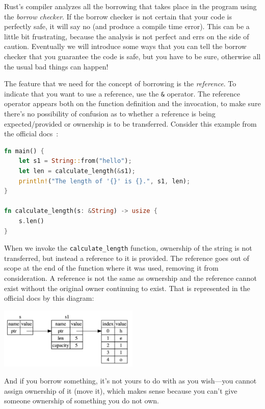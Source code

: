 \documentclass[a4paper]{report}
\begin{document}
Rust's compiler analyzes all the borrowing that takes place in the program using the \textit{borrow checker}. If the borrow checker is not certain that your code is perfectly safe, it will say no (and produce a compile time error). This can be a little bit frustrating, because the analysis is not perfect and errs on the side of caution. Eventually we will introduce some ways that you can tell the borrow checker that you guarantee the code is safe, but you have to be sure, otherwise all the usual bad things can happen!

The feature that we need for the concept of borrowing is the \textit{reference}. To indicate that you want to use a reference, use the \texttt{\&} operator. The reference operator appears both on the function definition and the invocation, to make sure there's no possibility of confusion as to whether a reference is being expected/provided or ownership is to be transferred.  Consider this example from the official docs~\cite{rustdocs}:

\begin{lstlisting}[language=Rust]
fn main() {
    let s1 = String::from("hello");
    let len = calculate_length(&s1);
    println!("The length of '{}' is {}.", s1, len);
}

fn calculate_length(s: &String) -> usize {
    s.len()
}
\end{lstlisting}

When we invoke the \texttt{calculate\_length} function, ownership of the string is not transferred, but instead a reference to it is provided. The reference goes out of scope at the end of the function where it was used, removing it from consideration. A reference is not the same as ownership and the reference cannot exist without the original owner continuing to exist. That is represented in the official docs by this diagram:

\begin{center}
\includegraphics[width=0.5\textwidth]{images/string-with-ref.png}
\end{center}

And if you borrow something, it's not yours to do with as you wish---you cannot assign ownership of it (move it), which makes sense because you can't give someone ownership of something you do not own.
\end{document}
